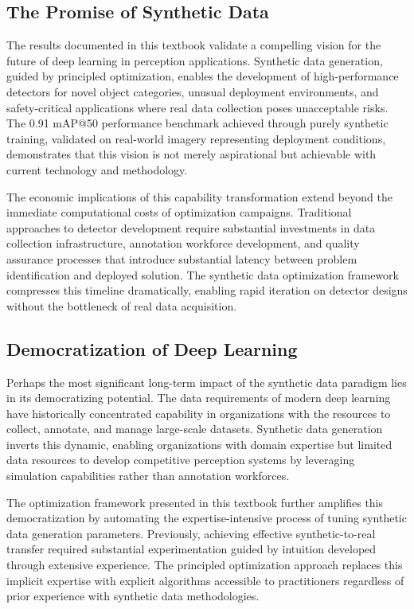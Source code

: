 \subsection{The Promise of Synthetic Data}
\label{subsec:promise}

The results documented in this textbook validate a compelling vision for the future of deep learning in perception applications. Synthetic data generation, guided by principled optimization, enables the development of high-performance detectors for novel object categories, unusual deployment environments, and safety-critical applications where real data collection poses unacceptable risks. The 0.91 mAP@50 performance benchmark achieved through purely synthetic training, validated on real-world imagery representing deployment conditions, demonstrates that this vision is not merely aspirational but achievable with current technology and methodology.

The economic implications of this capability transformation extend beyond the immediate computational costs of optimization campaigns. Traditional approaches to detector development require substantial investments in data collection infrastructure, annotation workforce development, and quality assurance processes that introduce substantial latency between problem identification and deployed solution. The synthetic data optimization framework compresses this timeline dramatically, enabling rapid iteration on detector designs without the bottleneck of real data acquisition.

\subsection{Democratization of Deep Learning}
\label{subsec:democratization}

Perhaps the most significant long-term impact of the synthetic data paradigm lies in its democratizing potential. The data requirements of modern deep learning have historically concentrated capability in organizations with the resources to collect, annotate, and manage large-scale datasets. Synthetic data generation inverts this dynamic, enabling organizations with domain expertise but limited data resources to develop competitive perception systems by leveraging simulation capabilities rather than annotation workforces.

The optimization framework presented in this textbook further amplifies this democratization by automating the expertise-intensive process of tuning synthetic data generation parameters. Previously, achieving effective synthetic-to-real transfer required substantial experimentation guided by intuition developed through extensive experience. The principled optimization approach replaces this implicit expertise with explicit algorithms accessible to practitioners regardless of prior experience with synthetic data methodologies.

